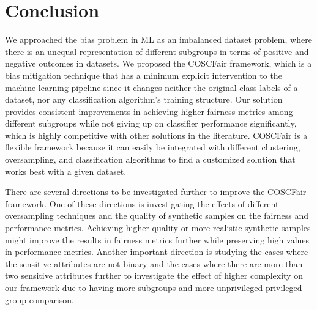 
\section{Conclusion} \label{sec:conclusion}

We approached the bias problem in ML as an imbalanced dataset problem, where there is an unequal representation of different subgroups in terms of positive and negative outcomes in datasets. We proposed the COSCFair framework, which is a bias mitigation technique that has a minimum explicit intervention to the machine learning pipeline since it changes neither the original class labels of a dataset, nor any classification algorithm's training structure. Our solution provides consistent improvements in achieving higher fairness metrics among different subgroups while not giving up on classifier performance significantly, which is highly competitive with other solutions in the literature. COSCFair is a flexible framework because it can easily be integrated with different clustering, oversampling, and classification algorithms to find a customized solution that works best with a given dataset.


There are several directions to be investigated further to improve the COSCFair framework. One of these directions is investigating the effects of different oversampling techniques and the quality of synthetic samples on the fairness and performance metrics. Achieving higher quality or more realistic synthetic samples might improve the results in fairness metrics further while preserving high values in performance metrics. Another important direction is studying the cases where the sensitive attributes are not binary and the cases where there are more than two sensitive attributes further to investigate the effect of higher complexity on our framework due to having more subgroups and more unprivileged-privileged group comparison.
